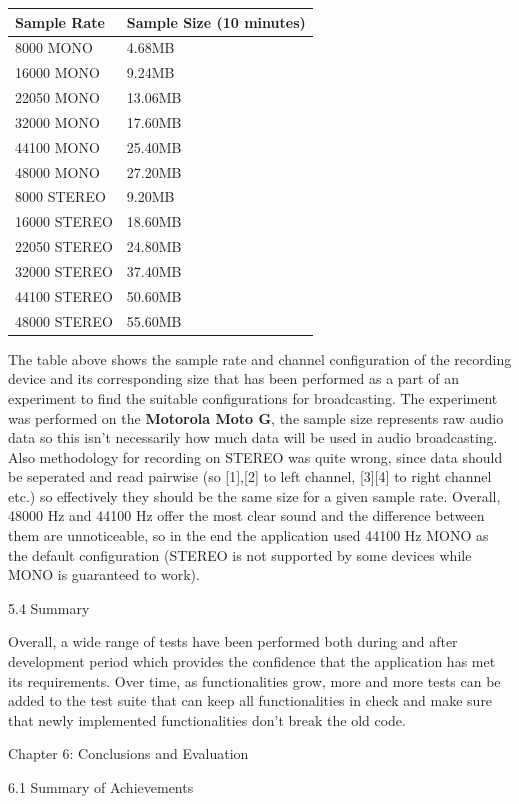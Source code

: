 \documentclass{article}
\begin{document}
\begin{flushleft}
\begin{longtable}{| l | l |}
\hline
Sample Rate	&  Sample Size (10 minutes)\\
\hline
8000 MONO &	4.68MB\\
\hline
16000 MONO &	9.24MB\\
\hline
22050 MONO & 13.06MB\\
\hline
32000 MONO &	17.60MB\\
\hline
44100 MONO &	25.40MB\\
\hline
48000 MONO &	27.20MB\\
\hline
8000 STEREO &	9.20MB\\
\hline
16000 STEREO & 18.60MB\\
\hline
22050 STEREO & 24.80MB\\
\hline
32000 STEREO & 37.40MB\\
\hline
44100 STEREO & 50.60MB\\
\hline
48000 STEREO & 55.60MB\\
\hline
\end{longtable}
The table above shows the sample rate and channel configuration of the recording device and its corresponding size that has been performed as a part of an experiment to find the suitable configurations for broadcasting. The experiment was performed on the \textbf{Motorola Moto G}, the sample size represents raw audio data so this isn't necessarily how much data will be used in audio broadcasting. Also methodology for recording on STEREO was quite wrong, since data should be seperated and read pairwise (so [1],[2] to left channel, [3][4] to right channel etc.) so effectively they should be the same size for a given sample rate. Overall, 48000 Hz and 44100 Hz offer the most clear sound and the difference between them are unnoticeable, so in the end the application used 44100 Hz MONO as the default configuration (STEREO is not supported by some devices while MONO is guaranteed to work).\par
{\Large 5.4 Summary}\par
Overall, a wide range of tests have been performed both during and after development period which provides the confidence that the application has met its requirements. Over time, as functionalities grow, more and more tests can be added to the test suite that can keep all functionalities in check and make sure that newly implemented functionalities don't break the old code.\par
\newpage
{\huge Chapter 6: Conclusions and Evaluation}\par
{\Large 6.1 Summary of Achievements}\par

\end{flushleft}
\end{document}
